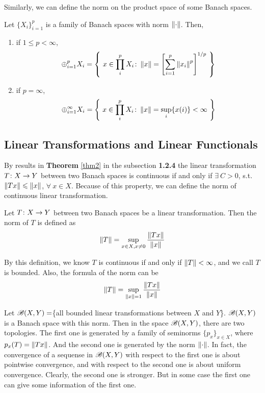 \documentclass[a4paper,11pt]{report}
\begin{document}
Similarly, we can define the norm on the product space of some Banach spaces.
\begin{defn}
	Let $\{X_i\}_{i=1}^{p}$ is a family of Banach spaces with norm $\left\lVert\cdot\right\lVert$. Then,
	\begin{enumerate}[label=\arabic*)]
		\item if $1 \leqslant p < \infty$, 
				\begin{equation*}
					\oplus_{i=1}^{p} X_i = \left\{~ x \in \prod_{i}^{p} X_i \colon \left\lVert x\right\lVert = \left[ \sum_{i=1}^p \left\lVert x_i\right\lVert^p\right]^{1/p} ~\right\}
				\end{equation*}
		\item if $p = \infty$,
				\begin{equation*}
					\oplus_{i=1}^{\infty} X_i = \left\{~ x \in \prod_{i}^{p} X_i \colon \left\lVert x\right\lVert = \sup_i \{x(i)\} < \infty ~\right\}
				\end{equation*}
	\end{enumerate}
\end{defn}

\subsection{Linear Transformations and Linear Functionals}

By results in \textbf{Theorem} \ref{thm2} in the subsection \textbf{1.2.4} the linear transformation $T \colon X \rightarrow Y$ between two Banach spaces is continuous if and only if $\exists~ C > 0$, s.t. $\left\lVert Tx\right\lVert \leqslant \left\lVert x\right\lVert$, $\forall~ x \in X$. Because of this property, we can define the norm of continuous linear transformation.

\begin{defn}
	Let $T \colon X \rightarrow Y$ between two Banach spaces be a linear transformation. Then the norm of $T$ is defined as
	\begin{equation*}
		\left\lVert T\right\lVert = \sup_{x \in X,x \neq 0} \frac{\left\lVert Tx\right\lVert}{\left\lVert x\right\lVert}
	\end{equation*}
\end{defn}
\begin{rem}
	By this definition, we know $T$ is continuous if and only if $\left\lVert T\right\lVert < \infty$, and we call $T$ is bounded. Also, the formula of the norm can be
	\begin{equation*}
		\left\lVert T\right\lVert = \sup_{\left\lVert x\right\lVert = 1} \frac{\left\lVert Tx\right\lVert}{\left\lVert x\right\lVert}
	\end{equation*}
\end{rem}

Let $\mathscr{B}(X,Y)=$\{all bounded linear transformations between $X$ and $Y$\}. $\mathscr{B}(X,Y)$ is a Banach space with this norm. Then in the space $\mathscr{B}(X,Y)$, there are two topologies. The first one is generated by a family of seminorms $\{p_x\}_{x \in X}$, where $p_x(T) = \left\lVert Tx\right\lVert$. And the second one is generated by the norm $\left\lVert\cdot\right\lVert$. In fact, the convergence of a sequense in $\mathscr{B}(X,Y)$ with respect to the first one is about pointwise convergence, and with respect to the second one is about uniform convergence. Clearly, the second one is stronger. But in some case the first one can give some information of the first one.
\end{document}
